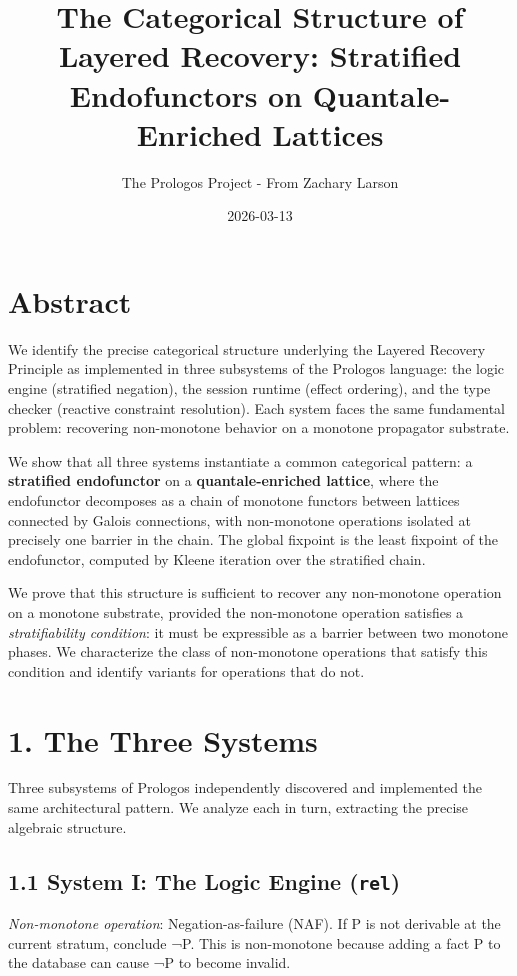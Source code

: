 \documentclass[11pt]{article}
\author{The Prologos Project - From Zachary Larson}
\date{2026-03-13}
\title{The Categorical Structure of Layered Recovery: Stratified Endofunctors on Quantale-Enriched Lattices}
\begin{document}
\maketitle
\tableofcontents

\section{Abstract}
\label{sec:org8545c93}

We identify the precise categorical structure underlying the Layered Recovery
Principle as implemented in three subsystems of the Prologos language: the logic
engine (stratified negation), the session runtime (effect ordering), and the type
checker (reactive constraint resolution). Each system faces the same fundamental
problem: recovering non-monotone behavior on a monotone propagator substrate.

We show that all three systems instantiate a common categorical pattern: a
\textbf{stratified endofunctor} on a \textbf{quantale-enriched lattice}, where the
endofunctor decomposes as a chain of monotone functors between lattices connected
by Galois connections, with non-monotone operations isolated at precisely one
barrier in the chain. The global fixpoint is the least fixpoint of the
endofunctor, computed by Kleene iteration over the stratified chain.

We prove that this structure is sufficient to recover any non-monotone operation
on a monotone substrate, provided the non-monotone operation satisfies a
\emph{stratifiability condition}: it must be expressible as a barrier between two
monotone phases. We characterize the class of non-monotone operations that
satisfy this condition and identify variants for operations that do not.
\section{1. The Three Systems}
\label{sec:org6d1645b}

Three subsystems of Prologos independently discovered and implemented the same
architectural pattern. We analyze each in turn, extracting the precise algebraic
structure.
\subsection{1.1 System I: The Logic Engine (\texttt{rel})}
\label{sec:org363ad45}

\emph{Non-monotone operation}: Negation-as-failure (NAF). If P is not derivable at
the current stratum, conclude ¬P. This is non-monotone because adding a fact P
to the database can cause ¬P to become invalid.
\end{document}
